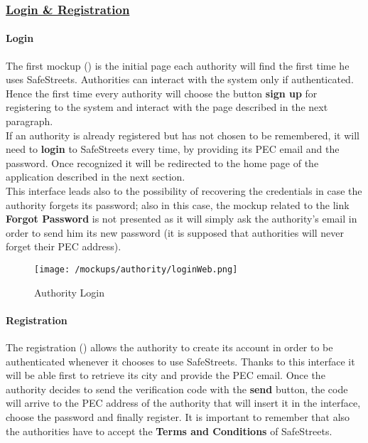 			\subsubsection[Login \& Registration]{\hyperlink{toc}{Login \& Registration}}
				\label{sec:authorityLoginRegistration}
				
				\paragraph{Login}
				The first mockup () is the initial page each authority will find the first time he uses SafeStreets. Authorities can interact with the system only if authenticated. Hence the first time every authority will choose the button \textbf{sign up} for registering to the system and interact with the page described in the next paragraph.\\
				
				If an authority is already registered but has not chosen to be remembered, it will need to \textbf{login} to SafeStreets every time, by providing its PEC email and the password. Once recognized it will be redirected to the home page of the application described in the next section.\\
				
				This interface leads also to the possibility of recovering the credentials in case the authority forgets its password; also in this case, the mockup related to the link \textbf{Forgot Password} is not presented as it will simply ask the authority's email in order to send him its new password (it is supposed that authorities will never forget their PEC address).
				
				\vspace{0.6cm}
				
				\begin{figure}[ht!]
					\centering
					\texttt{[image: /mockups/authority/loginWeb.png]}
					\caption{\label{fig:loginWeb} Authority Login}
				\end{figure}
			
				\paragraph{Registration}
				The registration () allows the authority to create its account in order to be authenticated whenever it chooses to use SafeStreets. Thanks to this interface it will be able first to retrieve its city and provide the PEC email. Once the authority decides to send the verification code with the \textbf{send} button, the code will arrive to the PEC address of the authority that will insert it in the interface, choose the password and finally register. It is important to remember that also the authorities have to accept the \textbf{Terms and Conditions} of SafeStreets.\\
				
